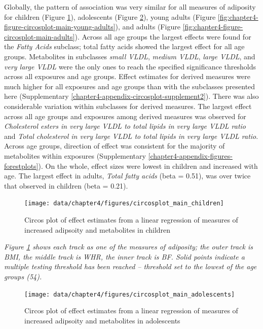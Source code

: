 \documentclass[11pt,twoside]{bristolthesis}
\newcommand{\bsmall}{\begin{small}}
\newcommand{\esmall}{\end{small}}
\begin{document}
Globally, the pattern of association was very similar for all measures of adiposity for children (Figure \ref{fig:chapter4-figure-circosplot-main-children}), adolescents (Figure \ref{fig:chapter4-figure-circosplot-main-adolescents}), young adults (Figure \ref{fig:chapter4-figure-circosplot-main-young-adults}), and adults (Figure \ref{fig:chapter4-figure-circosplot-main-adults}). Across all age groups the largest effects were found for the \emph{Fatty Acids} subclass; total fatty acids showed the largest effect for all age groups. Metabolites in subclasses \emph{small VLDL}, \emph{medium VLDL}, \emph{large VLDL}, and \emph{very large VLDL} were the only ones to reach the specified significance thresholds across all exposures and age groups. Effect estimates for derived measures were much higher for all exposures and age groups than with the subclasses presented here (Supplementary \ref{chapter4-appendix-circosplot-supplement2}). There was also considerable variation within subclasses for derived measures. The largest effect across all age groups and exposures among derived measures was observed for \emph{Cholesterol esters in very large VLDL to total lipids in very large VLDL ratio} and \emph{Total cholesterol in very large VLDL to total lipids in very large VLDL ratio}. Across age groups, direction of effect was consistent for the majority of metabolites within exposures (Supplementary \ref{chapter4-appendix-figures-forestplots}). On the whole, effect sizes were lowest in children and increased with age. The largest effect in adults, \emph{Total fatty acids} (beta = 0.51), was over twice that observed in children (beta = 0.21).
\begin{figure}
\texttt{[image: data/chapter4/figures/circosplot\_main\_children]} \caption{Circos plot of effect estimates from a linear regression of measures of increased adipsoity and metabolites in children}\label{fig:chapter4-figure-circosplot-main-children}
\end{figure}
\noindent 
\bsmall
\emph{Figure \ref{fig:chapter4-figure-circosplot-main-children} shows each track as one of the measures of adiposity; the outer track is BMI, the middle track is WHR, the inner track is BF. Solid points indicate a multiple testing threshold has been reached -- threshold set to the lowest of the age groups (54).}
\esmall
\begin{figure}
\texttt{[image: data/chapter4/figures/circosplot\_main\_adolescents]} \caption{Circos plot of effect estimates from a linear regression of measures of increased adipsoity and metabolites in adolescents}\label{fig:chapter4-figure-circosplot-main-adolescents}
\end{figure}
\end{document}
